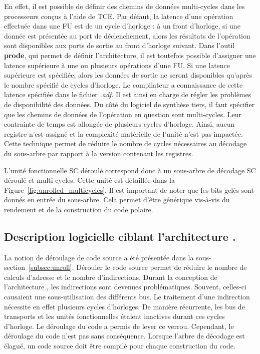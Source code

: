 En effet, il est possible de définir des chemins de données multi-cycles dans les processeurs conçus à l'aide de TCE. Par défaut, la latence d'une opération effectuée dans une FU est de un cycle d'horloge : à un front d'horloge, si une donnée est présentée au port de déclenchement, alors les résultats de l'opération sont disponibles aux ports de sortie au front d'horloge suivant. Dans l'outil \textbf{prode}, qui permet de définir l'architecture, il est toutefois possible d'assigner une latence supérieure à une ou plusieurs opérations d'une FU. Si une latence supérieure est spécifiée, alors les données de sortie ne seront disponibles qu'après le nombre spécifié de cycles d'horloge. Le compilateur a connaissance de cette latence spécifiée dans le fichier \textit{.adf}. Il est ainsi en charge de régler les problèmes de disponibilité des données. Du côté du logiciel de synthèse tiers, il faut spécifier que les chemins de données de l'opération en question sont multi-cycles. Leur contrainte de temps est allongée de plusieurs cycles d'horloge. Ainsi, aucun registre n'est assigné et la complexité matérielle de l'unité n'est pas impactée. Cette technique permet de réduire le nombre de cycles nécessaires au décodage du sous-arbre par rapport à la version contenant les registres.

L'unité fonctionnelle \og SC déroulé \fg correspond donc à un sous-arbre de décodage SC déroulé et multi-cycles. Cette unité est détaillée dans la Figure~\ref{fig:unrolled_multicycles}. Il est important de noter que les bits gelés sont donnés en entrée du sous-arbre. Cela permet d'être générique vis-à-vis du rendement et de la construction du code polaire.

\subsection{Description logicielle ciblant l'architecture \TTSC.}

La notion de déroulage de code source a été présentée dans la sous-section~\ref{subsec:unroll}. Dérouler le code source permet de réduire le nombre de calculs d'adresse et le nombre d'indirections. Durant la conception de l'architecture \TTSC, les indirections sont devenues problématiques. Souvent, celles-ci causaient une sous-utilisation des différents bus. Le traitement d'une indirection nécessite en effet plusieurs cycles d'horloges. De manière récurrente, les bus de transports et les unités fonctionnelles étaient inactives durant ces cycles d'horloge. Le déroulage du code a permis de lever ce verrou. Cependant, le déroulage du code n'est pas sans conséquence. Lorsque l'arbre de décodage est élagué, un code source doit être compilé pour chaque construction du code.


